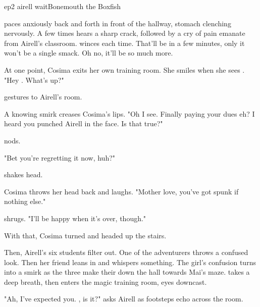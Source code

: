 \documentclass{book}
\begin{document}
\begin{childnode}{ep2 airell wait}{Bonemouth the Boxfish}

    \name{} paces anxiously back and forth in front of the hallway, \hisher{} stomach clenching nervously. A few times \heshe{} hears a sharp crack, followed by a cry of pain emanate from 
    Airell's classroom. \HeShe{} winces each time. That'll be \himher{} in a few minutes, only it won't be a single smack. Oh no, it'll be so much more.

    At one point, Cosima exits her own training room. She smiles when she sees \name{}. "Hey \nickname{}. What's up?"

    \name{} gestures to Airell's room.

    A knowing smirk creases Cosima's lips. "Oh I see. Finally paying your dues eh? I heard you punched Airell in the face. Is that true?"

    \name{} nods.

    "Bet you're regretting it now, huh?"

    \name{} shakes \hisher{} head.

    Cosima throws her head back and laughs. "Mother love, you've got spunk if nothing else."

    \name{} shrugs. "I'll be happy when it's over, though."

        {}

    With that, Cosima turned and headed up the stairs.

    Then, Airell's six students filter out. One of the adventurers throws \name{} a confused look. Then her friend leans in and whispers something. The girl's confusion turns into a smirk as
    the three make their down the hall towards Mai's maze. \name{} takes a deep breath, then enters the magic training room, \hisher{} eyes downcast. 

    "Ah, I've expected you. \name{}, is it?" asks Airell as \names{} footsteps echo across the room. 


\end{childnode}
\end{document}
